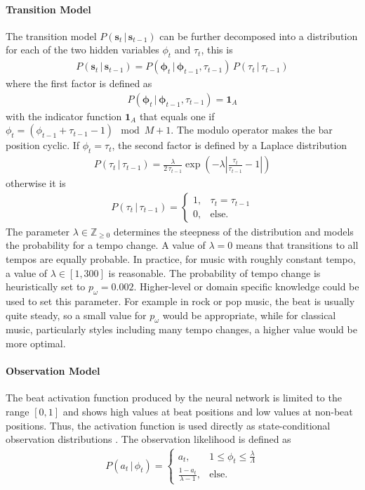 \documentclass{scrartcl}
\begin{document}
\paragraph{Transition Model} The transition model $P(\mathbf s_t\,|\,\mathbf s_{t-1})$ can be further decomposed into a distribution for each of the two hidden variables $\phi_t$ and $\tau_t$, this is
\begin{align}
P(\mathbf s_t\,|\,\mathbf s_{t-1}) = P(\mathbf \phi_t\,|\,\mathbf \phi_{t-1}, \tau_{t-1}) \, P(\tau_t \, |\, \tau_{t-1}) 
\end{align} 
where the first factor is defined as
\begin{align}
P(\mathbf \phi_t\,|\,\mathbf \phi_{t-1}, \tau_{t-1}) = \mathbf 1_A
\end{align} 
with the indicator function $\mathbf 1_A$ that equals one if $\phi_t = (\phi_{t-1}+\tau_{t-1}-1)\mod M+1$. The modulo operator makes the bar position cyclic. If $\phi_t = \tau_t$, the second factor is defined by a Laplace distribution
\begin{align}
P(\tau_t \, |\, \tau_{t-1}) = \frac{\lambda}{2 \, \tau_{t-1}}\exp \left( -\lambda \left| \frac{\tau_{t}}{\tau_{t-1}} -1 \right| \right)
\end{align} 
otherwise it is
\begin{align}
P(\tau_t \, |\, \tau_{t-1}) = \begin{cases}
    1, &\tau_t = \tau_{t-1}\\
    0, &\text{else.} 
\end{cases}
\end{align} 
The parameter $\lambda \in \mathbb Z_{\geq0}$ determines the steepness of the distribution and models the probability for a tempo change. A value of $\lambda = 0$ means that transitions to all tempos are equally probable. In practice, for music with roughly constant tempo, a value of $\lambda \in [1, 300]$ is reasonable. The probability of tempo change is heuristically set to $p_\omega = 0.002$. Higher-level or domain specific knowledge could be used to set this parameter. For example in rock or pop music, the beat is usually quite steady, so a small value for $p_\omega$ would be appropriate, while for classical music, particularly styles including many tempo changes, a higher value would be more optimal.


\paragraph{Observation Model}
The beat activation function produced by the neural network is limited to the range $[0, 1]$ and shows high values at beat positions and low values at non-beat positions. Thus, the activation function is used directly as state-conditional observation distributions \cite{Degara2012}. The observation likelihood is defined as 
\begin{align}
P(a_t\,|\,\phi_t) = \begin{cases}
    a_t, &1 \leq \phi_t\leq \frac{\lambda}{\Lambda}\\
    \frac{1-a_t}{\lambda-1}, &\text{else}.    
\end{cases}
\end{align} 
\end{document}
